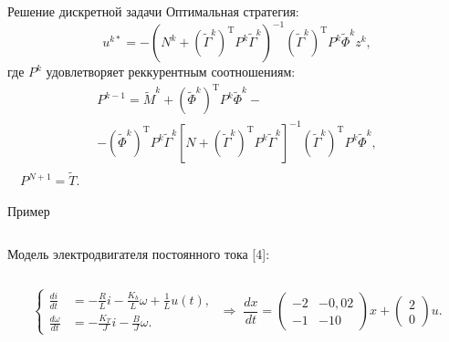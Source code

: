         \begin{frame}{Решение дискретной задачи}
                Оптимальная стратегия:
                $$
                                u^{k*} = -(N^k + (\tilde\Gamma^k)^{\mathrm{T}} P^{k}\tilde\Gamma^k)^{-1}(\tilde\Gamma^k)^{\mathrm{T}} P^{k} \tilde\Phi^k z^k,
                $$
                где $P^k$ удовлетворяет реккурентным соотношениям:
                \begin{multline*}
                        P^{k-1} = \tilde M^k + (\tilde\Phi^k)^{\mathrm{T}}P^k\tilde\Phi^k
                        -\\- (\tilde\Phi^k)^{\mathrm{T}}P^k\tilde\Gamma^k[N
                        + (\tilde\Gamma^k)^{\mathrm{T}}P^k\tilde\Gamma^k]^{-1}(\tilde\Gamma^k)^{\mathrm{T}}P^k\tilde\Phi^k, \\
                \end{multline*}
                $
                        \quad P^{N+1} = \tilde T.
                $
        \end{frame}
        \begin{frame}{Пример}
                \begin{columns}
                        \begin{column}{0.4\textwidth}
                                Модель электродвигателя постоянного тока [4]:
                        \end{column}
                        \begin{column}{0.6\textwidth}
                                
                        \end{column}
                \end{columns}
                $$
                        \left\{
                        \begin{aligned}
                        \frac {di}{dt}
                        &=
                        -\frac{R}{L}i
                        -
                        \frac{K_b}{L}\omega
                        +
                        \frac{1}{L}u(t),\\
                        \frac{d\omega}{dt}
                        &=
                        -\frac{K_T}{J}i
                        -
                        \frac{B}{J}\omega.
                        \end{aligned}
                        \right.
                        \;\Longrightarrow\;
                                \frac{dx}{dt}
                                =
                                \begin{pmatrix}
                        -2 & -0,\!02 \\
                        -1 & -10
                                \end{pmatrix}
                                x
                                +
                                \begin{pmatrix}
                        2 \\
                        0
                                \end{pmatrix}
                                u.
                $$
        \end{frame}
